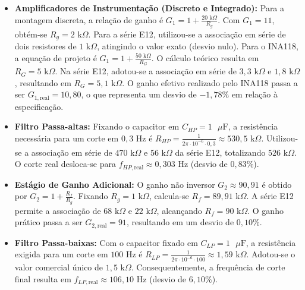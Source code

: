\documentclass[11pt,a4paper]{article}
\begin{document}
\begin{itemize}

    \item \textbf{Amplificadores de Instrumentação (Discreto e Integrado):} 
    Para a montagem discreta, a relação de ganho é $G_1 = 1 + \frac{20\text{ k}\Omega}{R_g}$. Com $G_1=11$, obtém-se $R_g = 2\text{ k}\Omega$. Para a série E12, utilizou-se a associação em série de dois resistores de $1\text{ k}\Omega$, atingindo o valor exato (desvio nulo).
    Para o INA118, a equação de projeto é $G_1 = 1 + \frac{50\text{ k}\Omega}{R_G}$. O cálculo teórico resulta em $R_G = 5\text{ k}\Omega$. Na série E12, adotou-se a associação em série de $3{,}3\text{ k}\Omega$ e $1{,}8\text{ k}\Omega$, resultando em $R_G = 5{,}1\text{ k}\Omega$. O ganho efetivo realizado pelo INA118 passa a ser $G_{1,\text{real}} = 10{,}80$, o que representa um desvio de $-1{,}78\%$ em relação à especificação.

    \item \textbf{Filtro Passa-altas:}
    Fixando o capacitor em $C_{HP}=1\text{ }\mu\text{F}$, a resistência necessária para um corte em $0{,}3\text{ Hz}$ é $R_{HP} = \frac{1}{2\pi \cdot 10^{-6} \cdot 0{,}3} \approx 530{,}5\text{ k}\Omega$. Utilizou-se a associação em série de $470\text{ k}\Omega$ e $56\text{ k}\Omega$ da série E12, totalizando $526\text{ k}\Omega$. O corte real desloca-se para $f_{HP,\text{real}} \approx 0{,}303\text{ Hz}$ (desvio de $0{,}83\%$).

    \item \textbf{Estágio de Ganho Adicional:}
    O ganho não inversor $G_2 \approx 90{,}91$ é obtido por $G_2 = 1 + \frac{R_f}{R_g}$. Fixando $R_g = 1\text{ k}\Omega$, calcula-se $R_f = 89{,}91\text{ k}\Omega$. A série E12 permite a associação de $68\text{ k}\Omega$ e $22\text{ k}\Omega$, alcançando $R_f = 90\text{ k}\Omega$. O ganho prático passa a ser $G_{2,\text{real}} = 91$, resultando em um desvio de $0{,}10\%$.

    \item \textbf{Filtro Passa-baixas:}
    Com o capacitor fixado em $C_{LP}=1\text{ }\mu\text{F}$, a resistência exigida para um corte em $100\text{ Hz}$ é $R_{LP} = \frac{1}{2\pi \cdot 10^{-6} \cdot 100} \approx 1{,}59\text{ k}\Omega$. Adotou-se o valor comercial único de $1{,}5\text{ k}\Omega$. Consequentemente, a frequência de corte final resulta em $f_{LP,\text{real}} \approx 106{,}10\text{ Hz}$ (desvio de $6{,}10\%$).

\end{itemize}
\end{document}
